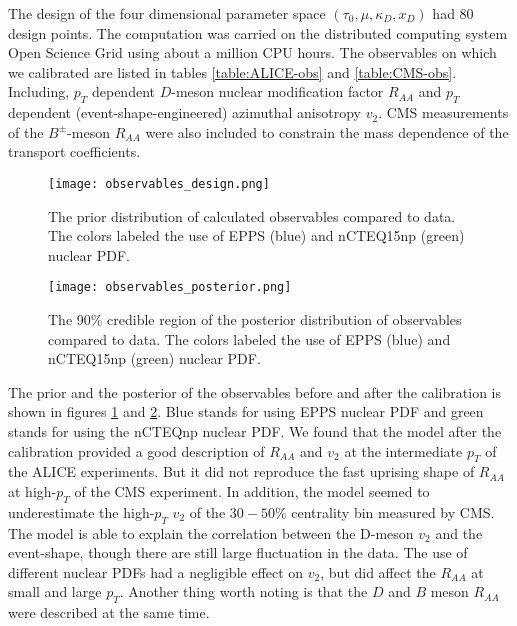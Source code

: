 The design of the four dimensional parameter space  $(\tau_0, \mu, \kappa_D, x_D)$ had 80 design points.
The computation was carried on the distributed computing system Open Science Grid \cite{Pordes:2007zzb,Sfiligoi:2010zz} using about a million CPU hours.
The observables on which we calibrated are listed in tables \ref{table:ALICE-obs} and \ref{table:CMS-obs}. 
Including, $p_T$ dependent $D$-meson nuclear modification factor $R_{AA}$ and $p_T$ dependent (event-shape-engineered) azimuthal anisotropy $v_2$.
CMS measurements of the $B^{\pm}$-meson $R_{AA}$ were also included to constrain the mass dependence of the transport coefficients.

\begin{figure}
\singlespacing
\texttt{[image: observables\_design.png]}
\caption[The prior distribution of calculated observables compared to data.]{The prior distribution of calculated observables compared to data. The colors labeled the use of EPPS (blue) and nCTEQ15np (green) nuclear PDF.}
\label{fig:LBT:obs_prior}
\end{figure}

\begin{figure}
\singlespacing
\texttt{[image: observables\_posterior.png]}
\caption[The 90\% credible region of the posterior distribution of observables]{The 90\% credible region of the posterior distribution of observables compared to data. The colors labeled the use of EPPS (blue) and nCTEQ15np (green) nuclear PDF.}
\label{fig:LBT:obs_posterior}
\end{figure}

The prior and the posterior of the observables before and after the calibration is shown in figures \ref{fig:LBT:obs_prior} and \ref{fig:LBT:obs_posterior}.
Blue stands for using EPPS nuclear PDF and green stands for using the nCTEQnp nuclear PDF.
We found that the model after the calibration provided a good description of $R_{AA}$ and $v_2$ at the intermediate $p_T$ of the ALICE experiments.
But it did not reproduce the fast uprising shape of $R_{AA}$ at high-$p_T$ of the CMS experiment.
In addition, the model seemed to underestimate the high-$p_T$ $v_2$ of the $30-50\%$ centrality bin measured by CMS.
The model is able to explain the correlation between the D-meson $v_2$ and the event-shape, though there are still large fluctuation in the data.
The use of different nuclear PDFs had a negligible effect on $v_2$, but did affect the $R_{AA}$ at small and large $p_T$.
Another thing worth noting is that the $D$ and $B$ meson $R_{AA}$ were described at the same time.

